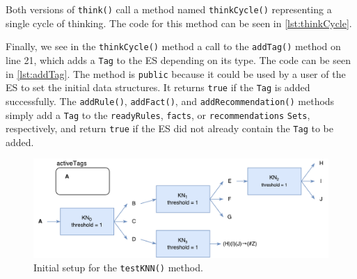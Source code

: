 \documentclass[titlepage,11pt]{article}
\def \espath {"C:/Users/Sean/IdeaProjects/Prometheus/src/es/ExpertSystem.java"}
\newcommand{\code}[1]{\texttt{#1}}
\begin{document}


Both versions of \code{think()} call a method named \code{thinkCycle()} representing a single cycle of thinking. The code for this method can be seen in \autoref{lst:thinkCycle}.



Finally, we see in the \code{thinkCycle()} method a call to the \code{addTag()} method on line 21, which adds a \code{Tag} to the ES depending on its type. The code can be seen in \autoref{lst:addTag}. The method is \code{public} because it could be used by a user of the ES to set the initial data structures. It returns \code{true} if the \code{Tag} is added successfully. The \code{addRule()}, \code{addFact()}, and \code{addRecommendation()} methods simply add a \code{Tag} to the \code{readyRules}, \code{facts}, or \code{recommendations} \code{Sets}, respectively, and return \code{true} if the ES did not already contain the \code{Tag} to be added.

\begin{figure}[!htb]
\includegraphics[width=\textwidth]{figures/testKNN.pdf}
\caption[Setup for the \code{testKNN()} method.]
{Initial setup for the \code{testKNN()} method.}
\label{testKNN}
\end{figure}
\end{document}
